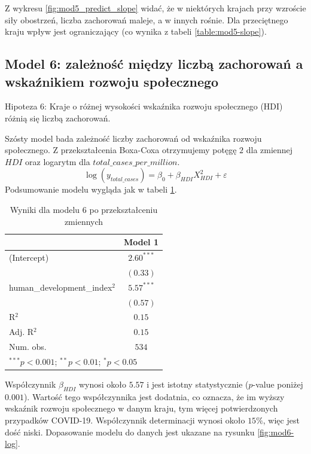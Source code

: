 \documentclass[12pt]{mwbk}
\theoremstyle{plain}
\theoremstyle{definition}
\theoremstyle{remark}
\begin{document}
Z wykresu \ref{fig:mod5_predict_slope} widać, że w niektórych krajach przy wzroście siły obostrzeń, liczba zachorowań maleje, a w innych rośnie. Dla przeciętnego kraju wpływ jest ograniczający (co wynika z tabeli \ref{table:mod5-slope}).

\newpage

\subsection{Model 6: zależność między liczbą zachorowań a wskaźnikiem rozwoju społecznego}

Hipoteza 6: Kraje o różnej wysokości wskaźnika rozwoju społecznego (HDI) różnią się liczbą zachorowań.

Szósty model bada zależność liczby zachorowań od wskaźnika rozwoju społecznego.
Z przekształcenia Boxa-Coxa otrzymujemy potęgę $2$ dla zmiennej $HDI$ oraz logarytm dla $total\_cases\_per\_million$.
$$\log(y_{total\_cases})=\beta_0+\beta_{HDI}X^2_{HDI}+\varepsilon$$
Podsumowanie modelu wygląda jak w tabeli \ref{table:mod6-log}.

\begin{table}[!htbp]
	\begin{center}
		\begin{tabular}{l c}
			\hline
			& Model 1 \\
			\hline
			(Intercept)                   & $2.60^{***}$ \\
			& $(0.33)$     \\
			human\_development\_index$^2$ & $5.57^{***}$ \\
			& $(0.57)$     \\
			\hline
			R$^2$                         & $0.15$       \\
			Adj. R$^2$                    & $0.15$       \\
			Num. obs.                     & $534$        \\
			\hline
			\multicolumn{2}{l}{\scriptsize{$^{***}p<0.001$; $^{**}p<0.01$; $^{*}p<0.05$}}
		\end{tabular}
		\caption{Wyniki dla modelu 6 po przekształceniu zmiennych}
		\label{table:mod6-log}
	\end{center}
\end{table}

Współczynnik $\beta_{HDI}$ wynosi około $5.57$ i jest istotny statystycznie ($p$-value poniżej $0.001$). Wartość tego współczynnika jest dodatnia, co oznacza, że im wyższy wskaźnik rozwoju społecznego w danym kraju, tym więcej potwierdzonych przypadków COVID-19. Współczynnik determinacji wynosi około $15\%$, więc jest dość niski. Dopasowanie modelu do danych jest ukazane na rysunku \ref{fig:mod6-log}.
\end{document}
